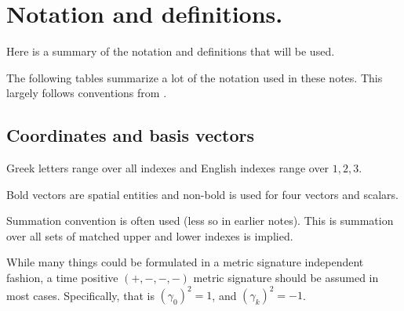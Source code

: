 \chapter{Notation and definitions.}\label{chap:notationTable}

Here is a summary of the notation and definitions that will be used.

The following tables summarize a lot of the notation used in these notes.
This largely follows conventions from \cite{doran2003gap}.

\section{Coordinates and basis vectors}

Greek letters range over all indexes and English indexes range over $1,2,3$.

Bold vectors are spatial entities and non-bold is used for four vectors and scalars.

Summation convention is often used (less so in earlier notes).  This is 
summation over all sets of matched upper and lower indexes is implied.

While many things could be formulated in a metric signature independent
fashion, 
a time positive
$(+,-,-,-)$
metric signature should be assumed in most cases.  Specifically, that is $(\gamma_0)^2 = 1$, and $(\gamma_k)^2 = -1$.

